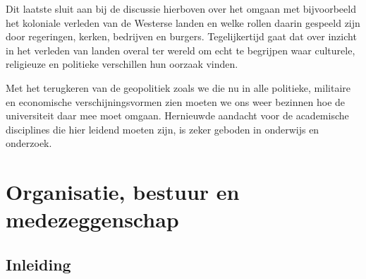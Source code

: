 \documentclass[smallauthor, chapterhaspagenum, nochapterinheader, pagenuminheader,  bigchapnum,medium2, tocpages,  garamond, titleinheader]{jote-book}
\begin{document}
	Dit laatste sluit aan bij de discussie hierboven over het omgaan met bijvoorbeeld het koloniale verleden van de Westerse landen en welke rollen daarin gespeeld zijn door regeringen, kerken, bedrijven en burgers. Tegelijkertijd gaat dat over inzicht in het verleden van landen overal ter wereld om echt te begrijpen waar culturele, religieuze en politieke verschillen hun oorzaak vinden.



	Met het terugkeren van de geopolitiek zoals we die nu in alle politieke, militaire en economische verschijningsvormen zien moeten we ons weer bezinnen hoe de universiteit daar mee moet omgaan. Hernieuwde aandacht voor de academische disciplines die hier leidend moeten zijn, is zeker geboden in onderwijs en onderzoek.







	\chapter{Organisatie, bestuur en medezeggenschap}



	\section{Inleiding}
\end{document}
